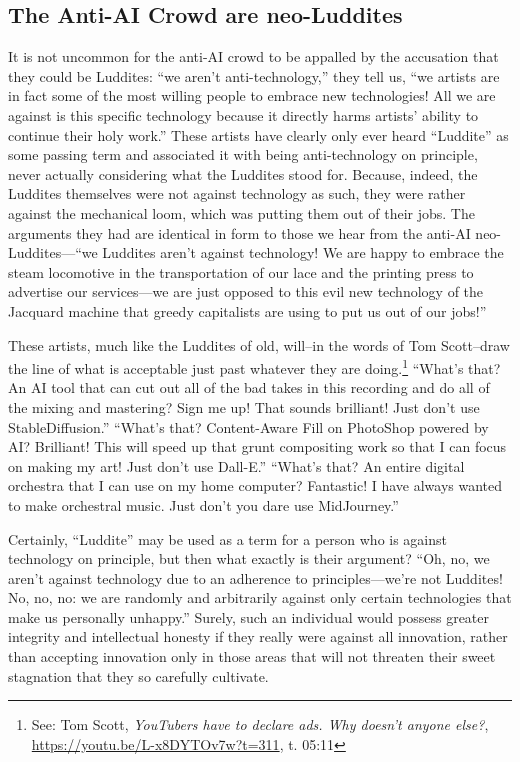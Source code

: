 \documentclass[11pt]{article}
\begin{document}
\subsection*{The Anti-AI Crowd are neo-Luddites}
\label{sec:org17e8450}
It is not uncommon for the anti-AI crowd to be appalled by the accusation that they could be Luddites: ``we aren't anti-technology,'' they tell us, ``we artists are in fact some of the most willing people to embrace new technologies! All we are against is this specific technology because it directly harms artists' ability to continue their holy work.'' These artists have clearly only ever heard ``Luddite'' as some passing term and associated it with being anti-technology on principle, never actually considering what the Luddites stood for. Because, indeed, the Luddites themselves were not against technology as such, they were rather against the mechanical loom, which was putting them out of their jobs. The arguments they had are identical in form to those we hear from the anti-AI neo-Luddites---``we Luddites aren't against technology! We are happy to embrace the steam locomotive in the transportation of our lace and the printing press to advertise our services---we are just opposed to this evil new technology of the Jacquard machine that greedy capitalists are using to put us out of our jobs!''

These artists, much like the Luddites of old, will--in the words of Tom Scott--draw the line of what is acceptable just past whatever they are doing.\footnote{See: Tom Scott, \emph{YouTubers have to declare ads. Why doesn't anyone else?}, \url{https://youtu.be/L-x8DYTOv7w?t=311}, t. 05:11} ``What's that? An AI tool that can cut out all of the bad takes in this recording and do all of the mixing and mastering? Sign me up! That sounds brilliant! Just don't use StableDiffusion.'' ``What's that? Content-Aware Fill on PhotoShop powered by AI? Brilliant! This will speed up that grunt compositing work so that I can focus on making my art! Just don't use Dall-E.'' ``What's that? An entire digital orchestra that I can use on my home computer? Fantastic! I have always wanted to make orchestral music. Just don't you dare use MidJourney.''

Certainly, ``Luddite'' may be used as a term for a person who is against technology on principle, but then what exactly is their argument? ``Oh, no, we aren't against technology due to an adherence to principles---we're not Luddites! No, no, no: we are randomly and arbitrarily against only certain technologies that make us personally unhappy.'' Surely, such an individual would possess greater integrity and intellectual honesty if they really were against all innovation, rather than accepting innovation only in those areas that will not threaten their sweet stagnation that they so carefully cultivate.
\end{document}
